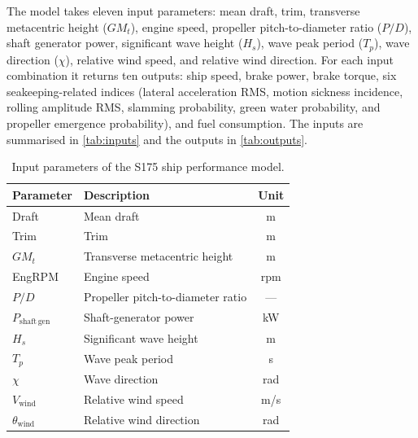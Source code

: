 \documentclass[final,5p,times,twocolumn,numbers]{elsarticle}
\begin{document}
The model takes eleven input parameters: mean draft, trim, transverse metacentric height ($GM_t$), engine speed, propeller pitch-to-diameter ratio ($P/D$), shaft generator power, significant wave height ($H_s$), wave peak period ($T_p$), wave direction ($\chi$), relative wind speed, and relative wind direction. For each input combination it returns ten outputs: ship speed, brake power, brake torque, six seakeeping-related indices (lateral acceleration RMS, motion sickness incidence, rolling amplitude RMS, slamming probability, green water probability, and propeller emergence probability), and fuel consumption. The inputs are summarised in \autoref{tab:inputs} and the outputs in \autoref{tab:outputs}.

\begin{table}[ht]
\centering
\caption{Input parameters of the S175 ship performance model.}
\label{tab:inputs}
\footnotesize
\setlength{\tabcolsep}{10pt}
\renewcommand{\arraystretch}{1.1}
\begin{tabular}{llc}
\toprule
Parameter & Description & Unit \\
\midrule
Draft & Mean draft & \unit{m} \\
Trim & Trim & \unit{m} \\
$GM_t$ & Transverse metacentric height & \unit{m} \\
EngRPM & Engine speed & \unit{rpm} \\
$P/D$ & Propeller pitch-to-diameter ratio & --- \\
$P_{\mathrm{shaft\,gen}}$ & Shaft-generator power & \unit{kW} \\
$H_s$ & Significant wave height & \unit{m} \\
$T_p$ & Wave peak period & \unit{s} \\
$\chi$ & Wave direction & \unit{rad} \\
$V_{\mathrm{wind}}$ & Relative wind speed & \unit{m/s} \\
$\theta_{\mathrm{wind}}$ & Relative wind direction & \unit{rad} \\
\bottomrule
\end{tabular}
\end{table}
\end{document}
